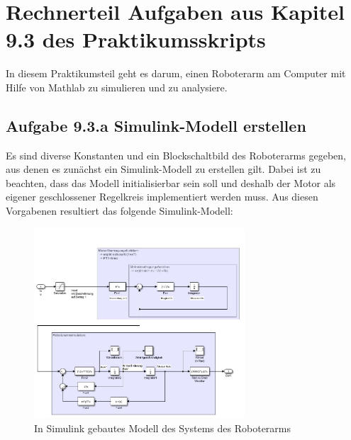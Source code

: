 \documentclass[10pt]{scrartcl}
\begin{document}











\section{Rechnerteil Aufgaben aus Kapitel 9.3 des Praktikumsskripts}
In diesem Praktikumsteil geht es darum, einen Roboterarm am Computer mit Hilfe von Mathlab zu simulieren und zu analysiere. 

\subsection{Aufgabe 9.3.a Simulink-Modell erstellen}
Es sind diverse Konstanten und ein Blockschaltbild des Roboterarms gegeben, aus denen es zunächst ein Simulink-Modell zu erstellen gilt. 
Dabei ist zu beachten, dass das Modell initialisierbar sein soll und deshalb der Motor als eigener geschlossener Regelkreis implementiert werden muss. 
Aus diesen Vorgabenen resultiert das folgende Simulink-Modell:

\begin{figure}[H]
	\centering
	\includegraphics[width=0.7\textwidth]{Theoretischer Teil/SimulinkModell.jpeg}
	\caption{In Simulink gebautes Modell des Systems des Roboterarms}
	\label{img:grafik-dummy}
\end{figure}
\end{document}
